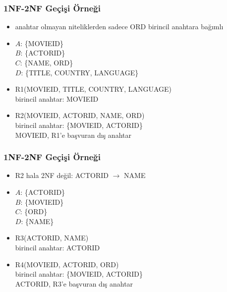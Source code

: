 \documentclass[dvipsnames]{beamer}
\theoremstyle{theorem}
\begin{document}
\begin{frame}
  \frametitle{1NF-2NF Geçişi Örneği}

    \begin{itemize}
      \item anahtar olmayan niteliklerden sadece ORD birincil anahtara bağımlı
  
      \item $A$: \{MOVIEID\}\\
        $B$: \{ACTORID\}\\
        $C$: \{NAME, ORD\}\\
        $D$: \{TITLE, COUNTRY, LANGUAGE\}
         
       \pause
       \medskip
       
       \item R1(MOVIEID, TITLE, COUNTRY, LANGUAGE)\\
          birincil anahtar: MOVIEID
        
        \item R2(MOVIEID, ACTORID, NAME, ORD)\\
          birincil anahtar: \{MOVIEID, ACTORID\}\\
          MOVIEID, R1'e başvuran dış anahtar
    \end{itemize}
\end{frame}


\begin{frame}
  \frametitle{1NF-2NF Geçişi Örneği}

    \begin{itemize}
      \item R2 hala 2NF değil: ACTORID $\rightarrow$ NAME
      \item $A$: \{ACTORID\}\\
        $B$: \{MOVIEID\}\\
        $C$: \{ORD\}\\
        $D$: \{NAME\}

    \pause
    \medskip

      \item R3(ACTORID, NAME)\\
        birincil anahtar: ACTORID


      \item R4(MOVIEID, ACTORID, ORD)\\
        birincil anahtar: \{MOVIEID, ACTORID\}\\
        ACTORID, R3'e başvuran dış anahtar
    \end{itemize}
\end{frame}
\end{document}
